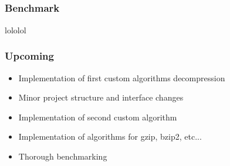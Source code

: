 \documentclass[compress]{beamer}
\begin{document}
\subsection*{}

\begin{frame}
	\frametitle{Benchmark}

	lololol
\end{frame}

\begin{frame}
	\frametitle{Upcoming}

	\begin{itemize}
		\item Implementation of first custom algorithms decompression
		\item Minor project structure and interface changes
		\item Implementation of second custom algorithm
		\item Implementation of algorithms for gzip, bzip2, etc...
		\item Thorough benchmarking
	\end{itemize}

\end{frame}
\end{document}
